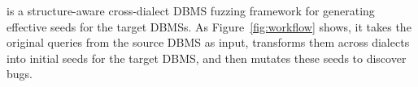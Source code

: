 \documentclass[sigconf,review,anonymous]{acmart}
\begin{document}

\tool{} is a structure-aware cross-dialect DBMS fuzzing framework for generating effective seeds for the target DBMSs.
As Figure~\ref{fig:workflow} shows, it takes the original queries from the source DBMS as input, transforms them across dialects into initial seeds for the target DBMS, and then mutates these seeds to discover bugs.





 
\end{document}
